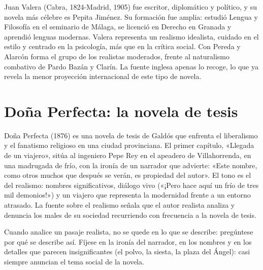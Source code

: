 \documentclass{book}
\begin{document}
Juan Valera (Cabra, 1824-Madrid, 1905) fue escritor, diplomático y político, y su novela más célebre es Pepita Jiménez. Su formación fue amplia: estudió Lengua y Filosofía en el seminario de Málaga, se licenció en Derecho en Granada y aprendió lenguas modernas. Valera representa un realismo idealista, cuidado en el estilo y centrado en la psicología, más que en la crítica social. Con Pereda y Alarcón forma el grupo de los realistas moderados, frente al naturalismo combativo de Pardo Bazán y Clarín. La fuente inglesa apenas lo recoge, lo que ya revela la menor proyección internacional de este tipo de novela.


\section{Doña Perfecta: la novela de tesis}

Doña Perfecta (1876) es una novela de tesis de Galdós que enfrenta el liberalismo y el fanatismo religioso en una ciudad provinciana. El primer capítulo, «Llegada de un viajero», sitúa al ingeniero Pepe Rey en el apeadero de Villahorrenda, en una madrugada de frío, con la ironía de un narrador que advierte: «Este nombre, como otros muchos que después se verán, es propiedad del autor». El tono es el del realismo: nombres significativos, diálogo vivo («¡Pero hace aquí un frío de tres mil demonios!») y un viajero que representa la modernidad frente a un entorno atrasado. La fuente sobre el realismo señala que el autor realista analiza y denuncia los males de su sociedad recurriendo con frecuencia a la novela de tesis.


\begin{tcolorbox}[title={Consejo}, studiumtip, breakable]

Cuando analice un pasaje realista, no se quede en lo que se describe: pregúntese por qué se describe así. Fíjese en la ironía del narrador, en los nombres y en los detalles que parecen insignificantes (el polvo, la siesta, la plaza del Ángel): casi siempre anuncian el tema social de la novela.

\end{tcolorbox}
\end{document}
